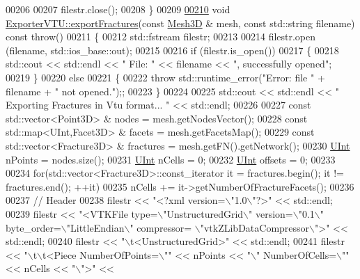 \begin{DoxyCode}
00206 
00207     filestr.close();
00208 \}
00209 
\hypertarget{ExportVTU_8cpp_source.tex_l00210}{}\hyperlink{classFVCode3D_1_1ExporterVTU_abdb2e3f36907610720d698d9bfa9428d}{00210} \textcolor{keywordtype}{void} \hyperlink{classFVCode3D_1_1ExporterVTU_abdb2e3f36907610720d698d9bfa9428d}{ExporterVTU::exportFractures}(\textcolor{keyword}{const} \hyperlink{classFVCode3D_1_1Mesh3D}{Mesh3D} & mesh, \textcolor{keyword}{const} std::string 
      filename) \textcolor{keyword}{const} \textcolor{keywordflow}{throw}()
00211 \{
00212     std::fstream filestr;
00213 
00214     filestr.open (filename, std::ios\_base::out);
00215 
00216     \textcolor{keywordflow}{if} (filestr.is\_open())
00217     \{
00218         std::cout << std::endl << \textcolor{stringliteral}{" File: "} << filename << \textcolor{stringliteral}{", successfully opened"};
00219     \}
00220     \textcolor{keywordflow}{else}
00221     \{
00222         \textcolor{keywordflow}{throw} std::runtime\_error(\textcolor{stringliteral}{"Error: file "} + filename + \textcolor{stringliteral}{" not opened."});;
00223     \}
00224 
00225     std::cout << std::endl << \textcolor{stringliteral}{" Exporting Fractures in Vtu format... "} << std::endl;
00226 
00227     \textcolor{keyword}{const} std::vector<Point3D> & nodes = mesh.getNodesVector();
00228     \textcolor{keyword}{const} std::map<UInt,Facet3D> & facets = mesh.getFacetsMap();
00229     \textcolor{keyword}{const} std::vector<Fracture3D> & fractures = mesh.getFN().getNetwork();
00230     \hyperlink{namespaceFVCode3D_a4bf7e328c75d0fd504050d040ebe9eda}{UInt} nPoints = nodes.size();
00231     \hyperlink{namespaceFVCode3D_a4bf7e328c75d0fd504050d040ebe9eda}{UInt} nCells = 0;
00232     \hyperlink{namespaceFVCode3D_a4bf7e328c75d0fd504050d040ebe9eda}{UInt} offsets = 0;
00233 
00234     \textcolor{keywordflow}{for}(std::vector<Fracture3D>::const\_iterator it = fractures.begin(); it != fractures.end(); ++it)
00235         nCells += it->getNumberOfFractureFacets();
00236 
00237     \textcolor{comment}{// Header}
00238     filestr << \textcolor{stringliteral}{"<?xml version=\(\backslash\)"1.0\(\backslash\)"?>"} << std::endl;
00239     filestr << \textcolor{stringliteral}{"<VTKFile type=\(\backslash\)"UnstructuredGrid\(\backslash\)" version=\(\backslash\)"0.1\(\backslash\)" byte\_order=\(\backslash\)"LittleEndian\(\backslash\)" compressor=
      \(\backslash\)"vtkZLibDataCompressor\(\backslash\)">"} << std::endl;
00240     filestr << \textcolor{stringliteral}{"\(\backslash\)t<UnstructuredGrid>"} << std::endl;
00241     filestr << \textcolor{stringliteral}{"\(\backslash\)t\(\backslash\)t<Piece NumberOfPoints=\(\backslash\)""} << nPoints << \textcolor{stringliteral}{"\(\backslash\)" NumberOfCells=\(\backslash\)""} << nCells << \textcolor{stringliteral}{"\(\backslash\)">"} << 

\end{DoxyCode}
